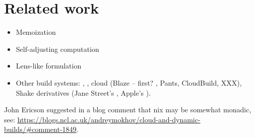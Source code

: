 \clearpage
\section{Related work}\label{sec-related}

\begin{itemize}
    \item Memoization
    \item Self-adjusting computation
    \item Lens-like formulation
    \item Other build systems: \Ninja, ,
          cloud (Blaze -- first? \Buck, Pants, CloudBuild, XXX),
          Shake derivatives (Jane Street's , Apple's ).
\end{itemize}

John Ericson suggested in a blog comment that nix may be somewhat monadic, see:
\url{https://blogs.ncl.ac.uk/andreymokhov/cloud-and-dynamic-builds/\#comment-1849}.
